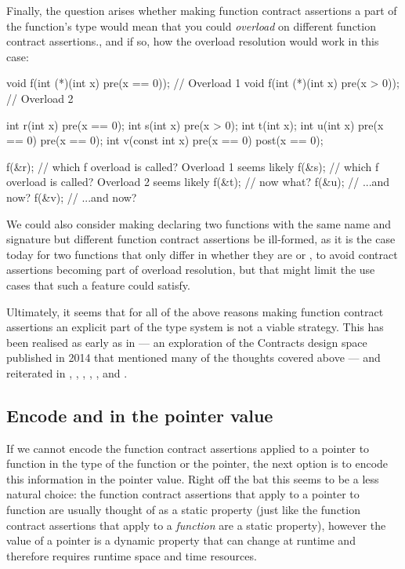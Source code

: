 Finally, the question arises whether making function contract assertions a part of the function's type would mean that you could \emph{overload} on different function contract assertions., and if so, how the overload resolution would work in this case:
\begin{codeblock}
void f(int (*)(int x) pre(x == 0));  // Overload 1
void f(int (*)(int x) pre(x > 0));   // Overload 2

int r(int x) pre(x == 0);
int s(int x) pre(x > 0);
int t(int x);
int u(int x) pre(x == 0) pre(x == 0);
int v(const int x) pre(x == 0) post(x == 0);

f(&r);  // which f overload is called? Overload 1 seems likely
f(&s);  // which f overload is called? Overload 2 seems likely
f(&t);  // now what?
f(&u);  // ...and now?
f(&v);  // ...and now?
\end{codeblock}
We could also consider making declaring two functions with the same name and signature but different function contract assertions be ill-formed, as it is the case today for two functions that only differ in whether they are  or , to avoid contract assertions becoming part of overload resolution, but that might limit the use cases that such a feature could satisfy.

Ultimately, it seems that for all of the above reasons making function contract assertions an explicit part of the type system is not a viable strategy. This has been realised as early as in \cite{N4110} --- an exploration of the Contracts design space published in 2014 that mentioned many of the thoughts covered above --- and reiterated in \cite{N4415}, \cite{P0246R0}, \cite{P0247R0}, \cite{P0287R0}, \cite{P0380R1}, and \cite{P0542R5}.

\subsection{Encode  and  in the pointer value}
\label{subsec:makevalue}

If we cannot encode the function contract assertions applied to a pointer to function in the type of the function or the pointer, the next option is to encode this information in the pointer value. Right off the bat this seems to be a less natural choice: the function contract assertions that apply to a pointer to function are usually thought of as a static property (just like the function contract assertions that apply to a \emph{function} are a static property), however the value of a pointer is a dynamic property that can change at runtime and therefore requires runtime space and time resources.

